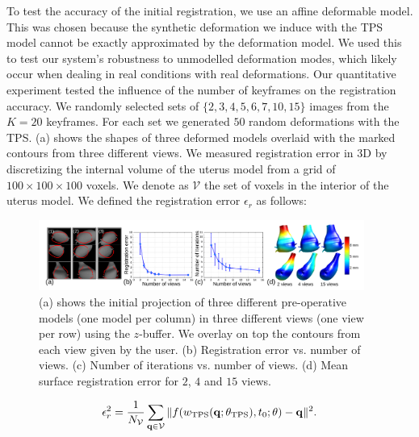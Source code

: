 %
To test the accuracy of the initial registration, we use an affine deformable model. This was chosen because the synthetic deformation we induce with the TPS model cannot be exactly approximated by the deformation model. We used this to test our system's robustness to unmodelled deformation modes, which likely occur when dealing in real conditions with real deformations.
Our quantitative experiment tested the influence of the number of keyframes on the registration accuracy. We randomly selected sets of $\{2,3,4,5,6,7,10,15\}$ images from the $K=20$ keyframes. For each set we generated $50$ random deformations with the TPS. (a) shows the shapes of three deformed models overlaid with the marked contours from three different views. We measured registration error in 3D by discretizing the internal volume of the uterus model from a grid of $100\times 100 \times 100$ voxels. We denote as $\mathcal{V}$ the set of voxels in the interior of the uterus model. We defined the registration error $\epsilon_r$ as follows:
\begin{figure}[htbp]
  \centering
  \includegraphics[width=0.95\textwidth]{./figs/errors.pdf}
\caption{(a) shows the initial projection of three different pre-operative models (one model per column) in three different views (one view per row) using the $z$-buffer. We overlay on top the contours from each view given by the user. (b) Registration error vs. number of views. (c) Number of iterations vs. number of views. (d) Mean surface registration error for $2$, $4$ and $15$ views.}
\label{fig:results}
\end{figure}
\begin{equation}
  \label{eq:regerror}
  \epsilon^2_r=\frac{1}{N_{\mathcal{V}}}\sum_{\mathbf{q}\in \mathcal{V}} \|f(\wTPS(\mathbf{q};\thetaTPS),t_0;\theta)-\mathbf{q}\|^2. 
\end{equation}

